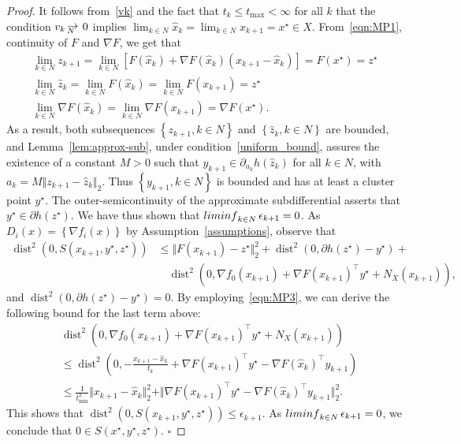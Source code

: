 \documentclass[10pt,a4paper]{amsart}
\def\Nto{\,{\raise 1pt\hbox{$\rightarrow$}}\kern -12pt
     \hbox{\lower 3pt \hbox{$\, \scriptstyle N$}}\hskip7pt}
\newcommand{\col}[1]{\left\{#1\right\}}
\DeclareMathOperator{\dist}{dist}
\newcommand{\mybox}{{\hfill $\square$}}
\newcommand{\nliminf}{\mathop{\rm liminf}\nolimits}
\newcommand{\norm}[1]{\textstyle{\Vert} #1 \textstyle{\Vert}_2}
\begin{document}
\begin{proof}
It follows from~\eqref{vk} and the fact that $t_k\leq t_{\max}<\infty$ for all $k$ that the condition $v_k \Nto 0$
implies $\lim_{k \in N} \hat x_{k} =  \lim_{k \in N} x_{k+1}= x^\star \in X$.
From~\eqref{eqn:MP1}, continuity of $F$ and $\nabla F$, we get that
\begin{align*}
\lim_{k \in N} z_{k+1}=\lim_{k \in N} [F(\hat x_k)+\nabla F(\hat x_k) (x_{k+1}-\hat x_k)] = F(x^\star) = z^\star\\
\lim_{k \in N} \hat z_{k}=\lim_{k \in N} F(\hat x_k)=\lim_{k \in N} F( x_{k+1})  = z^\star\\
\lim_{k \in N} \nabla F(\hat x_k)=\lim_{k \in N} \nabla F(x_{k+1}) = \nabla F(x^\star).
\end{align*}
As a result, both subsequences $\col{z_{k+1}, k \in N}$ and $\col{\hat z_{k}, k \in N}$ are bounded, and Lemma~\ref{lem:approx-sub}, under condition~\eqref{uniform_bound}, assures the existence of a constant $M>0$ such that $y_{k+1}\in \partial_{a_k} h(\hat z_{k})$ for all $k \in N$, with $a_k=M\norm{z_{k+1}-\hat z_k}$. Thus $\col{y_{k+1}, k\in N}$ is bounded and has at least a cluster point $y^\star$. The outer-semicontinuity of the approximate subdifferential asserts that  $y^\star \in  \partial h(z^\star)$. We have thus shown that  $\nliminf_{k\in N} \epsilon_{k+1}=0$.
As $D_i(x)=\col{\nabla f_i(x)}$ by Assumption~\ref{assumptions}, observe that
\begin{align*}
\dist^2(0, S(x_{k+1},y^\star,z^\star)) &
\leq \norm{F(x_{k+1})- z^\star}^2 + \dist^2(0,\partial h(z^\star) - y^\star) +\\
&\quad \dist^2(0,\nabla f_0(x_{k+1})+ \nabla F(x_{k+1})^\top  y^\star  + N_X( x_{k+1})),
\end{align*}
and $\dist^2(0,\partial h( z^\star) -y^\star) =0$. By employing~\eqref{eqn:MP3}, we can derive the following bound for the last term above:
\begin{align*}
 & \dist^2(0,\nabla f_0(x_{k+1})+ \nabla F(x_{k+1})^\top  y^\star  + N_X( x_{k+1})) \\
 &\leq \dist^2(0, -\frac{x_{k+1}-\hat x_k}{t_k}+\nabla F(x_{k+1})^\top  y^\star - \nabla F(\hat x_{k})^\top  y_{k+1}  ) \\
 &\leq \frac{1}{t_{\min}^2}\norm{x_{k+1}-\hat x_k}^2 + \norm{\nabla F(x_{k+1})^\top  y^\star - \nabla F(\hat x_{k})^\top  y_{k+1} }^2.
\end{align*}
This shows that $\dist^2(0, S(x_{k+1}, y^\star, z^\star)) \leq \epsilon_{k+1}$.
As $\nliminf_{k\in N} \epsilon_{k+1}=0$, we conclude that $0 \in S(x^\star, y^\star, z^\star)$.
\mybox
\end{proof}
\end{document}
